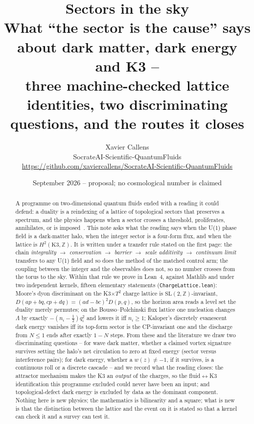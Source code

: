 \documentclass[11pt,a4paper]{article}
\title{\textbf{Sectors in the sky}\\
\large What ``the sector is the cause'' says about dark matter, dark energy and K3 --\\
three machine-checked lattice identities, two discriminating questions, and the routes it closes}
\author{Xavier Callens\\
\small SocrateAI-Scientific-QuantumFluids\\
\small \url{https://github.com/xaviercallens/SocrateAI-Scientific-QuantumFluids}}
\date{September 2026 -- proposal; no cosmological number is claimed}
\newcommand{\lean}[1]{\texttt{\small #1}}
\begin{document}
\maketitle

\begin{abstract}
\noindent
A programme on two-dimensional quantum fluids ended with a reading it could defend: a duality is a reindexing
of a lattice of topological sectors that preserves a spectrum, and the physics happens when a sector crosses a
threshold, proliferates, annihilates, or is imposed~\cite{Callens2026Duality}. This note asks what the reading
says when the U(1) phase field is a dark-matter halo, when the integer sector is a four-form flux, and when the
lattice is $H^2(\mathrm{K3},\mathbb Z)$. It is written under a transfer rule stated on the first page: the chain
\emph{integrality $\to$ conservation $\to$ barrier $\to$ scale additivity $\to$ continuum limit} transfers to any
U(1) field and so does the method of the matched control arm; the coupling between the integer and the
observables does not, so no number crosses from the torus to the sky. Within that rule we prove in Lean~4,
against Mathlib and under two independent kernels, fifteen elementary statements
(\lean{ChargeLattice.lean}): Moore's dyon discriminant on the K3$\times T^2$ charge lattice is
$\mathrm{SL}(2,\mathbb Z)$-invariant, $D(ap+bq,cp+dq)=(ad-bc)^2D(p,q)$, so the horizon area reads a level set the
duality merely permutes; on the Bousso--Polchinski flux lattice one nucleation changes $\Lambda$ by exactly
$-(n_i-\tfrac12)q_i^2$ and lowers it iff $n_i\ge1$; Kaloper's discretely evanescent dark energy vanishes iff its
top-form sector is the CP-invariant one and the discharge from $N\le1$ ends after exactly $1-N$ steps. From these
and the literature we draw two discriminating questions -- for wave dark matter, whether a claimed vortex
signature survives setting the halo's net circulation to zero at fixed energy (sector versus interference
pairs); for dark energy, whether a $w(z)\neq-1$, if it survives, is a continuous roll or a discrete cascade -- and
we record what the reading closes: the attractor mechanism makes the K3 an \emph{output} of the charges, so the
fluid$\leftrightarrow$K3 identification this programme excluded could never have been an input; and
topological-defect dark energy is excluded by data as the dominant component. Nothing here is new physics; the
mathematics is bilinearity and a square; what is new is that the distinction between the lattice and the event
on it is stated so that a kernel can check it and a survey can test it.
\end{abstract}
\end{document}
